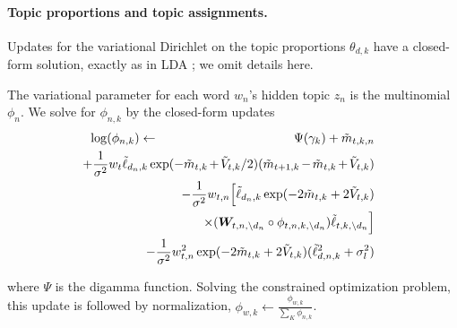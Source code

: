\paragraph{Topic proportions and topic assignments.}
Updates for the variational Dirichlet on the topic proportions
$\theta_{d,k}$ have a closed-form solution, exactly as in LDA
\cite{blei:2003}; we omit details here.

The variational parameter for each word $w_n$'s hidden topic $z_n$ is
the multinomial $\phi_n$.  We solve for $\phi_{n,k}$ by the
closed-form updates
\begin{eqnarray*}
\small
 \log(\phi_{n,k}) & \gets & \Psi(\gamma_k) + \mv_{t,k,n} \nonumber \\
& & \hspace{-68pt} + \frac{1}{\sigma^2} w_{t} \ellv_{d_n,k} \exp(-\mv_{t,k} \hspace{-1pt} + \hspace{-1pt} \vv_{t,k} / 2) (\mv_{t+1,k} \hspace{-1pt} - \hspace{-1pt} \mv_{t,k} \hspace{-1pt} + \hspace{-1pt} \vv_{t,k})  \\
   & & \hspace{-68pt} - \frac{1}{\sigma^2} w_{t,n} \Big[ \ellv_{d_n,k} \exp(-2\mv_{t,k} + 2 \vv_{t,k}) \\
& & \hspace{-22pt} \times (\bm W_{t,n,\setminus{d_n}} \circ \phi_{t,n,k,\setminus{d_n}}) \ellv_{t,k,\setminus d_n} \Big] \\
& & \hspace{-68pt} - \frac{1}{\sigma^2} w_{t,n}^2 \exp(-2\mv_{t,k} + 2 \vv_{t,k}) (\ellv_{d,n,k}^2 + \sigma_l^2) \\
\end{eqnarray*}

\vspace{-20pt}
where $\Psi$ is the digamma function. Solving the constrained
optimization problem, this update is followed by normalization,
$\phi_{w, k} \gets \frac{\phi_{w, k}}{\sum_K \phi_{n, k}}$.

